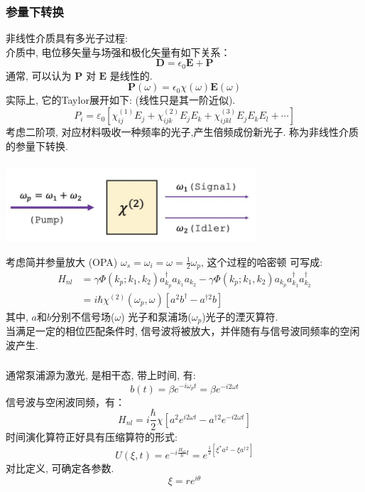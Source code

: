   \begin{frame}
        \frametitle{参量下转换}
  非线性介质具有多光子过程: \\ 
  介质中, 电位移矢量与场强和极化矢量有如下关系：
  \[ \mathbf{D}=\epsilon_0 \mathbf{E} + \mathbf{P}  \]
  通常, 可以认为 $\mathbf{P}$ 对 $\mathbf{E}$ 是线性的. 
  \[\mathbf{P}(\omega)= \epsilon_0 \chi(\omega) \mathbf{E}(\omega) \]
  实际上, 它的Taylor展开如下: (线性只是其一阶近似).
  \[ P_{i}=\varepsilon_{0}\left[\chi_{i j}^{(1)} E_{j}+\chi_{i j k}^{(2)} E_{j} E_{k}+\chi_{i j k l}^{(3)} E_{j} E_{k} E_{l}+\cdots\right] \]
  考虑二阶项, 对应材料吸收一种频率的光子,产生倍频成份新光子. 称为非线性介质的参量下转换. 
\end{frame}

\begin{frame}
 \frametitle{}
        \begin{center}
             \includegraphics[width=0.7\textwidth]{figs/2022-05-02-20-00-04.png}
        \end{center}
        考虑简并参量放大 (OPA) $\omega_s = \omega_i = \omega = \frac{1}{2} \omega_p$, 这个过程的哈密顿 可写成: 
    \[ 
        \begin{aligned}
            H_{nl} & = \gamma  \Phi\left(k_{p} ; k_{1}, k_{2}\right) a_{k_{p}} ^ \dagger  a_{k_{1}} a_{k_{2}} - \gamma  \Phi\left(k_{p} ; k_{1}, k_{2}\right) a_{k_{p}} a_{k_{1}}^{\dagger} a_{k_{2}}^{\dagger} \\ 
            &= i \hbar \chi ^{(2)} (\omega_p, \omega) [ a^2 b^\dagger -  a ^{\dagger 2} b ]
            \end{aligned} \]
    其中, $a$和$b$分别不信号场($\omega$) 光子和泵浦场($\omega_p$)光子的湮灭算符.  \\ 
    当满足一定的相位匹配条件时, 信号波将被放大，并伴随有与信号波同频率的空闲波产生. 
\end{frame}

\begin{frame}
 \frametitle{}
     通常泵浦源为激光, 是相干态, 带上时间, 有:
    \[ b(t) = \beta e ^{-i \omega_p t} = \beta e ^{-i 2 \omega t} \]
    信号波与空闲波同频，有：
     \[ H_{nl} = i \frac{\hbar}{2} \chi [ a^2 e ^{i 2 \omega t} -  a ^{\dagger 2} e ^{-i 2 \omega t}]  \]
     时间演化算符正好具有压缩算符的形式: 
     \[U(\xi, t) = e^{- i \frac{H_{nl}}{\hbar} t}  =  e^{\frac{1}{2}[\xi^* a^2 - \xi a^{\dagger 2} ]} \]
    对比定义, 可确定各参数.
    \[ \xi = r e ^ {i \theta } \]
\end{frame}

